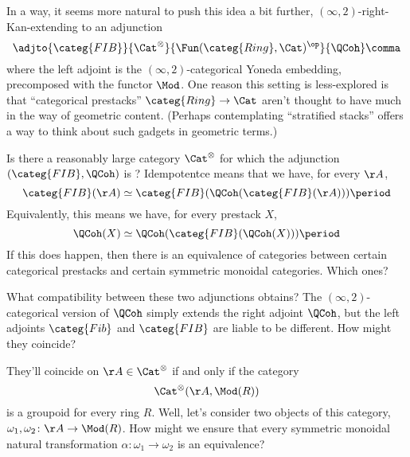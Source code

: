 \documentclass[leqno]{article}
\begin{document}
In a way, it seems more natural to push this idea a bit further,
\((\infty,2)\)-right-Kan-extending to an adjunction
\begin{equation*}
    \adjto{\categ{FIB}}{\Cat^{\otimes}}
    {\Fun(\categ{Ring},\Cat)^{\op}}{\QCoh} \comma
\end{equation*}
where the left adjoint is the \((\infty,2)\)-categorical
Yoneda embedding, precomposed with the functor \(\Mod\).
One reason this setting is less-explored is that
\enquote{categorical prestacks} \(\categ{Ring} \to \Cat\)
aren't thought to have
much in the way of geometric content.
(Perhaps contemplating \enquote{stratified stacks} offers
a way to think about such gadgets in geometric terms.)

\begin{qst}
    Is there a reasonably large category \(\Cat^{\otimes}\) for which
    the adjunction \((\categ{FIB},\QCoh)\) is ?
    Idempotentce means that we have, for every \(\AA\), 
    \begin{equation*}
        \categ{FIB}(\AA) \simeq
        \categ{FIB}(\QCoh(\categ{FIB}(\AA))) \period
    \end{equation*}
    Equivalently, this means we have, for every prestack \(X\),
    \begin{equation*}
        \QCoh(X) \simeq 
        \QCoh(\categ{FIB}(\QCoh(X))) \period
    \end{equation*}
    If this does happen, then there is an equivalence of categories
    between certain categorical prestacks and
    certain symmetric monoidal categories.
    Which ones?
\end{qst}

What compatibility between these two adjunctions obtains?
The \((\infty,2)\)-categorical version of \(\QCoh\) simply extends
the right adjoint \(\QCoh\), but the left adjoints
\(\categ{Fib}\) and \(\categ{FIB}\) are liable to be different.
How might they coincide?

They'll coincide on \(\AA \in \Cat^{\otimes}\) if and only if
the category
\begin{equation*}
    \Cat^{\otimes}(\AA, \Mod(R))
\end{equation*}
is a groupoid for every ring \(R\).
Well, let's consider two objects of this category,
\(\omega_{1}, \omega_{2} \colon \AA \to \Mod(R)\).
How might we ensure that every symmetric monoidal
natural transformation
\(\alpha \colon \omega_{1} \to \omega_{2}\)
is an equivalence?
\end{document}
